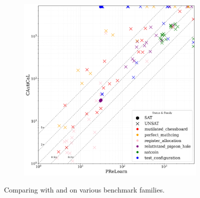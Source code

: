 \begin{figure}[!t]
    \begin{subfigure}[t]{0.45\textwidth}
        \centering
        \includegraphics[width=\textwidth]{figs/prelearn_vs_cautical_interesting_legend.jpg}
        \label{fig:cautical-vs-prelearn}
    \end{subfigure}

    \caption{Comparing \tool with \cadical and \prelearn on various benchmark families.}
    \label{fig:solver-comparison-familis}
\end{figure}












